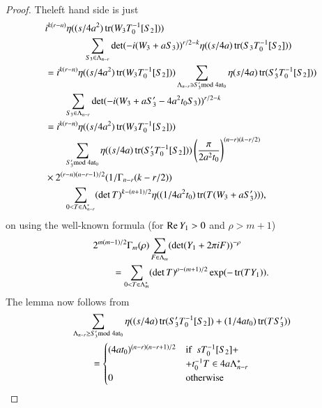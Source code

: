 \begin{proof}
The\pageoriginale left hand side is just
\begin{align*}
&i^{k(r-n)}\eta((s/4a^{2})\operatorname{tr}(W_{3}T^{-1}_{0}[S_{2}]))\\
&\qquad\qquad\sum_{S_{3}\in\Lambda_{n-r}}\det
(-i(W_{3}+aS_{3}))^{r/2-k}\eta((s/4a)\operatorname{tr}(S_{3}T^{-1}_{0}[S_{2}]))\\
&=i^{k(r-n)}\eta((s/4a^{2})\operatorname{tr}(W_{3}T^{-1}_{0}[S_{2}]))\sum_{\Lambda_{n-r}\ni
  S'_{3}\rm{mod} \;  4at_{0}}\eta(s/4a)\operatorname{tr}(S'_{3}T^{-1}_{0}[S_{2}]))\\
&\qquad\sum_{S_{3}\in\Lambda_{n-r}}\det(-i(W_{3}+aS'_{3}-4a^{2}t_{0}S_{3}))^{r/2-k}\\
&=i^{k(r-n)}\eta((s/4a^{2})\operatorname{tr}(W_{3}T^{-1}_{0}[S_{2}]))\\
&\qquad\sum_{S'_{3}\rm{mod} \; 4at_{0}}\eta((s/4a)\operatorname{tr}(S'_{3}T^{-1}_{0}[S_{2}]))\left(\frac{\pi}{2a^{2}t_{0}}\right)^{(n-r)(k-r/2)}\\
&\times 2^{(r-n)(n-r-1)/2}(1/\Gamma_{n-r}(k-r/2))\\
&\qquad\sum_{0<T\in\Lambda^{\ast}_{n-r}}(\det
T)^{k-(n+1)/2}\eta((1/4a^{2}t_{0})\operatorname{tr}(T(W_{3}+aS'_{3}))), 
\end{align*}
on using the well-known formula (for $\text{Re\,}Y_{1}>0$ and
$\rho>m+1$)
\begin{align*}
& 2^{m(m-1)/2}\Gamma_{m}(\rho)\sum_{F\in\Lambda_{m}}(\det (Y_{1}+2\pi
iF))^{-\rho}\\
&\qquad =\sum_{0<T\in\Lambda^{\ast}_{m}}(\det
T)^{\rho-(m+1)/2}\exp(-\operatorname{tr}(TY_{1})). 
\end{align*}
The lemma now follows from
\begin{align*}
&\sum_{\Lambda_{n-r}\geq S'_{3}\rm{mod} \;
  4at_{0}}\eta((s/4a)\operatorname{tr}(S'_{3}T^{-1}_{0}[S_{2}])+(1/4at_{0})\operatorname{tr}(TS'_{3}))\\
&\qquad=\begin{cases}
(4at_{0})^{(n-r)(n-r+1)/2} & \text{if \ } sT^{-1}_{0}[S_{2}]+\\
 & +t^{-1}_{0}T\in 4a\Lambda^{\ast}_{n-r}\\
0 & \text{otherwise}
\end{cases}
\end{align*}
\end{proof}

